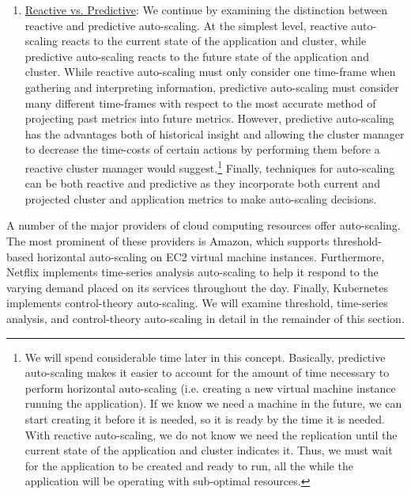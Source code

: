 \begin{enumerate}
  \item \underline{Reactive vs. Predictive}: We continue by
    examining the distinction between reactive and predictive
    auto-scaling. At the simplest level, reactive auto-scaling reacts to
    the current state of the application and cluster, while predictive
    auto-scaling reacts to the future state of the application and cluster.\cite[pg.
    12]{auto-scaling-techniques-for-elastic-applications-in-cloud-environments}
    While reactive auto-scaling must only consider one
    time-frame when gathering and interpreting information, predictive
    auto-scaling must consider many different time-frames with respect to the
    most accurate method of projecting past metrics into future metrics. However,
    predictive auto-scaling has the advantages both of historical insight and allowing
    the cluster manager to decrease the time-costs of certain actions by performing
    them before a reactive cluster manager would suggest.\footnote{We will spend
    considerable time later in this concept. Basically, predictive auto-scaling
    makes it easier to account for the amount of time necessary to perform
    horizontal auto-scaling (i.e. creating a new virtual machine instance running
    the application). If we know we need a machine in the future, we can start
    creating it before it is needed, so it is ready by the time it is needed. With reactive
    auto-scaling, we do not know we need the replication until the current state of
    the application and cluster indicates it. Thus, we must wait for the
    application to be created and ready to run,
    all the while the application will be operating with
    sub-optimal resources.}
    Finally, techniques for auto-scaling can be both reactive and predictive as
    they incorporate both current and projected cluster and application metrics
    to make auto-scaling decisions.
\end{enumerate}

A number of the major providers of cloud computing resources offer auto-scaling.
The most prominent of these providers is Amazon, which supports threshold-based
horizontal auto-scaling on EC2 virtual machine
instances.\cite{amazon-auto-scaling-developer-guide} Furthermore, Netflix
implements time-series analysis auto-scaling to help it respond to the
varying demand placed on its services throughout the
day.\cite{netflix-scryer-part-i} Finally, Kubernetes
implements control-theory auto-scaling.\cite{k8s-horizontal-pod-autoscaler-proposal}
We will examine threshold, time-series analysis, and control-theory
auto-scaling in detail in the remainder of this section.

